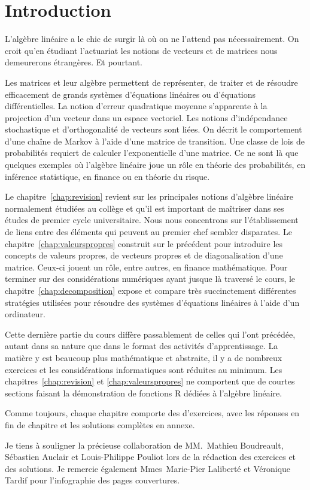 \chapter*{Introduction}

L'algèbre linéaire a le chic de surgir là où on ne l'attend pas
nécessairement. On croit qu'en étudiant l'actuariat les notions de
vecteurs et de matrices nous demeurerons étrangères. Et pourtant.

Les matrices et leur algèbre permettent de représenter, de traiter et
de résoudre efficacement de grands systèmes d'équations linéaires ou
d'équations différentielles. La notion d'erreur quadratique moyenne
s'apparente à la projection d'un vecteur dans un espace vectoriel. Les
notions d'indépendance stochastique et d'orthogonalité de vecteurs
sont liées. On décrit le comportement d'une chaîne de Markov à l'aide
d'une matrice de transition. Une classe de lois de probabilités
requiert de calculer l'exponentielle d'une matrice. Ce ne sont là que
quelques exemples où l'algèbre linéaire joue un rôle en théorie des
probabilités, en inférence statistique, en finance ou en théorie du
risque.

Le chapitre~\ref{chap:revision} revient sur les principales notions
d'algèbre linéaire normalement étudiées au collège et qu'il est
important de maîtriser dans ses études de premier cycle universitaire.
Nous nous concentrons sur l'établissement de liens entre des éléments
qui peuvent au premier chef sembler disparates. Le
chapitre~\ref{chap:valeurspropres} construit sur le précédent pour
introduire les concepts de valeurs propres, de vecteurs propres et de
diagonalisation d'une matrice. Ceux-ci jouent un rôle, entre autres,
en finance mathématique. Pour terminer sur des considérations
numériques ayant jusque là traversé le cours, le
chapitre~\ref{chap:decomposition} expose et compare très succinctement
différentes stratégies utilisées pour résoudre des systèmes
d'équations linéaires à l'aide d'un ordinateur.

Cette dernière partie du cours diffère passablement de celles qui
l'ont précédée, autant dans sa nature que dans le format des activités
d'apprentissage. La matière y est beaucoup plus mathématique et
abstraite, il y a de nombreux exercices et les considérations
informatiques sont réduites au minimum. Les
chapitres~\ref{chap:revision} et \ref{chap:valeurspropres} ne
comportent que de courtes sections faisant la démonstration de
fonctions R dédiées à l'algèbre linéaire.

Comme toujours, chaque chapitre comporte des d'exercices, avec les
réponses en fin de chapitre et les solutions complètes en annexe.

Je tiens à souligner la précieuse collaboration de MM.~Mathieu
Boudreault, Sébastien Auclair et Louis-Philippe Pouliot lors de la
rédaction des exercices et des solutions. Je remercie également
Mmes~Marie-Pier Laliberté et Véronique Tardif pour l'infographie des
pages couvertures.

